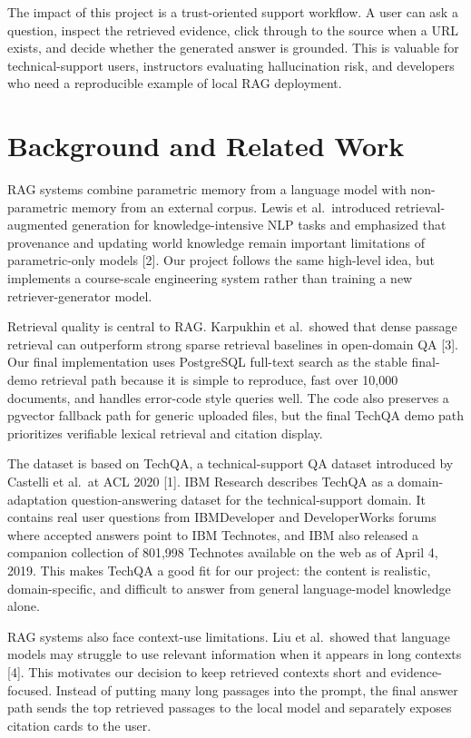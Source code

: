 \documentclass[paper=a4, fontsize=11pt]{scrartcl}
\begin{document}
The impact of this project is a trust-oriented support workflow. A user can ask a question, inspect the retrieved evidence, click through to the source when a URL exists, and decide whether the generated answer is grounded. This is valuable for technical-support users, instructors evaluating hallucination risk, and developers who need a reproducible example of local RAG deployment.

\section{Background and Related Work}

RAG systems combine parametric memory from a language model with non-parametric memory from an external corpus. Lewis et al.\ introduced retrieval-augmented generation for knowledge-intensive NLP tasks and emphasized that provenance and updating world knowledge remain important limitations of parametric-only models [2]. Our project follows the same high-level idea, but implements a course-scale engineering system rather than training a new retriever-generator model.

Retrieval quality is central to RAG. Karpukhin et al.\ showed that dense passage retrieval can outperform strong sparse retrieval baselines in open-domain QA [3]. Our final implementation uses PostgreSQL full-text search as the stable final-demo retrieval path because it is simple to reproduce, fast over 10,000 documents, and handles error-code style queries well. The code also preserves a pgvector fallback path for generic uploaded files, but the final TechQA demo path prioritizes verifiable lexical retrieval and citation display.

The dataset is based on TechQA, a technical-support QA dataset introduced by Castelli et al.\ at ACL 2020 [1]. IBM Research describes TechQA as a domain-adaptation question-answering dataset for the technical-support domain. It contains real user questions from IBMDeveloper and DeveloperWorks forums where accepted answers point to IBM Technotes, and IBM also released a companion collection of 801,998 Technotes available on the web as of April 4, 2019. This makes TechQA a good fit for our project: the content is realistic, domain-specific, and difficult to answer from general language-model knowledge alone.

RAG systems also face context-use limitations. Liu et al.\ showed that language models may struggle to use relevant information when it appears in long contexts [4]. This motivates our decision to keep retrieved contexts short and evidence-focused. Instead of putting many long passages into the prompt, the final answer path sends the top retrieved passages to the local model and separately exposes citation cards to the user.
\end{document}
